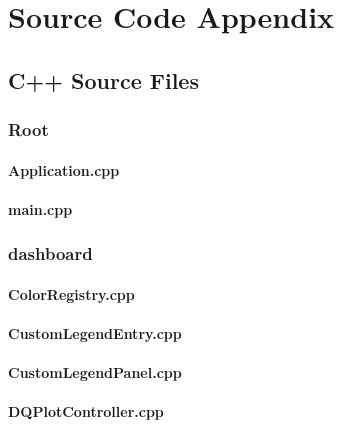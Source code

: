 
\chapter{Source Code Appendix}

\section{C++ Source Files}

\subsection*{Root}

\subsubsection*{Application.cpp}


\subsubsection*{main.cpp}


\subsection*{dashboard}

\subsubsection*{ColorRegistry.cpp}


\subsubsection*{CustomLegendEntry.cpp}


\subsubsection*{CustomLegendPanel.cpp}


\subsubsection*{DQPlotController.cpp}


